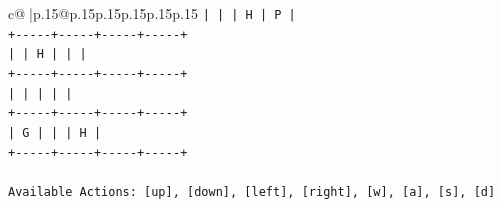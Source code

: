 \documentclass{article}
\begin{document}
{\begin{supertabular}{c@{$\;$}|p{.15\linewidth}@{}p{.15\linewidth}p{.15\linewidth}p{.15\linewidth}p{.15\linewidth}p{.15\linewidth}}
{{{\texttt{|     |     |  H  |  P  |} \\
\texttt{+{-}{-}{-}{-}{-}+{-}{-}{-}{-}{-}+{-}{-}{-}{-}{-}+{-}{-}{-}{-}{-}+} \\
\texttt{|     |  H  |     |     |} \\
\texttt{+{-}{-}{-}{-}{-}+{-}{-}{-}{-}{-}+{-}{-}{-}{-}{-}+{-}{-}{-}{-}{-}+} \\
\texttt{|     |     |     |     |} \\
\texttt{+{-}{-}{-}{-}{-}+{-}{-}{-}{-}{-}+{-}{-}{-}{-}{-}+{-}{-}{-}{-}{-}+} \\
\texttt{|  G  |     |     |  H  |} \\
\texttt{+{-}{-}{-}{-}{-}+{-}{-}{-}{-}{-}+{-}{-}{-}{-}{-}+{-}{-}{-}{-}{-}+} \\
\\ 
\texttt{Available Actions: {[}up{]}, {[}down{]}, {[}left{]}, {[}right{]}, {[}w{]}, {[}a{]}, {[}s{]}, {[}d{]}} \\
            }
        }
    }
     \\ \\


\end{supertabular}}
\end{document}
